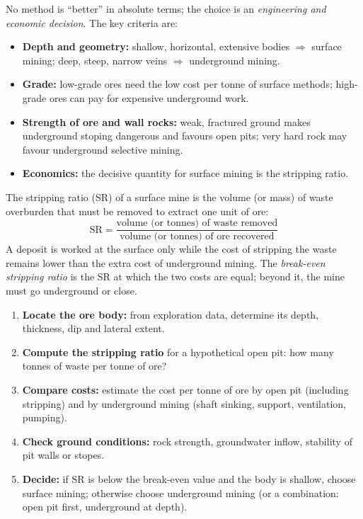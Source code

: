 \documentclass[11pt]{article}
\newcommand{\cle}[1]{{\popxbold\color{popdark}#1}}
\begin{document}
No method is ``better'' in absolute terms; the choice is an \emph{engineering and economic decision}. The key criteria are:

\begin{itemize}
\item \textbf{Depth and geometry:} shallow, horizontal, extensive bodies $\Rightarrow$ surface mining; deep, steep, narrow veins $\Rightarrow$ underground mining.
\item \textbf{Grade:} low-grade ores need the low cost per tonne of surface methods; high-grade ores can pay for expensive underground work.
\item \textbf{Strength of ore and wall rocks:} weak, fractured ground makes underground stoping dangerous and favours open pits; very hard rock may favour underground selective mining.
\item \textbf{Economics:} the decisive quantity for surface mining is the \cle{stripping ratio}.
\end{itemize}

\begin{definition}
The \cle{stripping ratio} (SR) of a surface mine is the volume (or mass) of waste overburden that must be removed to extract one unit of ore:
\[ \mathrm{SR} = \frac{\text{volume (or tonnes) of waste removed}}{\text{volume (or tonnes) of ore recovered}} \]
A deposit is worked at the surface only while the cost of stripping the waste remains lower than the extra cost of underground mining. The \emph{break-even stripping ratio} is the SR at which the two costs are equal; beyond it, the mine must go underground or close.
\end{definition}

\begin{methode}
\begin{enumerate}
\item \textbf{Locate the ore body:} from exploration data, determine its depth, thickness, dip and lateral extent.
\item \textbf{Compute the stripping ratio} for a hypothetical open pit: how many tonnes of waste per tonne of ore?
\item \textbf{Compare costs:} estimate the cost per tonne of ore by open pit (including stripping) and by underground mining (shaft sinking, support, ventilation, pumping).
\item \textbf{Check ground conditions:} rock strength, groundwater inflow, stability of pit walls or stopes.
\item \textbf{Decide:} if SR is below the break-even value and the body is shallow, choose surface mining; otherwise choose underground mining (or a combination: open pit first, underground at depth).
\end{enumerate}
\end{methode}
\end{document}

